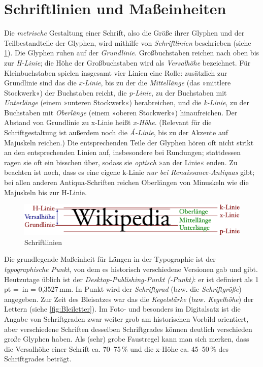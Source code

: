 \section{Schriftlinien und Maßeinheiten}
\label{sec:Linien}

Die \emph{metrische} Gestaltung einer Schrift, also die Größe ihrer
Glyphen und der Teilbestandteile der Glyphen, wird mithilfe von
\emph{Schriftlinien} beschrieben (siehe \cref{fig:Liniensystem}).  Die
Glyphen ruhen auf der \emph{Grundlinie}.  Großbuchstaben reichen nach
oben bis zur \emph{H-Linie}; die Höhe der Großbuchstaben wird als
\emph{Versalhöhe} bezeichnet.  Für Kleinbuchstaben spielen insgesamt
vier Linien eine Rolle: zusätzlich zur Grundlinie sind das die
\emph{x-Linie}, bis zu der die \emph{Mittellänge} (das »mittlere
Stockwerk«) der Buchstaben reicht, die \emph{p-Linie}, zu der
Buchstaben mit \emph{Unterlänge} (einem »unteren Stockwerk«)
herabreichen, und die \emph{k-Linie}, zu der Buchstaben mit
\emph{Oberlänge} (einem »oberen Stockwerk«) hinaufreichen.  Der
Abstand von Grundlinie zu x-Linie heißt \emph{x-Höhe}.  (Relevant für
die Schriftgestaltung ist außerdem noch die \emph{Á-Linie}, bis zu der
Akzente auf Majuskeln reichen.)  Die entsprechenden Teile der Glyphen
hören oft nicht strikt an den entsprechenden Linien auf, insbesondere
bei Rundungen; stattdessen ragen sie oft ein bisschen über, sodass sie
\emph{optisch} »an der Linie« enden.  Zu beachten ist noch, dass es
eine eigene k-Linie \emph{nur bei Renaissance-Antiquas} gibt; bei
allen anderen Antiqua-Schriften reichen Oberlängen von Minuskeln wie
die Majuskeln bis zur \mbox{H-Linie}.

\begin{figure}
  \centering
  \includegraphics[width=\textwidth]{Liniensystem}
  \caption{Schriftlinien\protect\footnotemark}
  \label{fig:Liniensystem}
\end{figure}

Die grundlegende Maßeinheit für Längen in der Typographie ist der
\emph{typographische Punkt}, von dem es historisch verschiedene
Versionen gab und gibt.  Heutzutage üblich ist der
\emph{Desktop-Publishing-Punkt} \emph{(-Punkt)}: er ist
definiert als 1\,pt = \,in =
0,352$\overline{\text{7}}$\,mm.  In Punkt wird der \emph{Schriftgrad}
(bzw. die \emph{Schriftgröße}) angegeben.  Zur Zeit des Bleisatzes war
das die \emph{Kegelstärke} (bzw. \emph{Kegelhöhe}) der Lettern (siehe
\cref{fig:Bleiletter}).  Im Foto- und besonders im Digitalsatz ist die
Angabe von Schriftgraden zwar weiter grob am historischen Vorbild
orientiert, aber verschiedene Schriften desselben Schriftgrades können
deutlich verschieden große Glyphen haben.  Als (sehr) grobe Faustregel
kann man sich merken, dass die Versalhöhe einer Schrift ca. 70--75\,\%
und die x-Höhe ca. 45--50\,\% des Schriftgrades beträgt.

